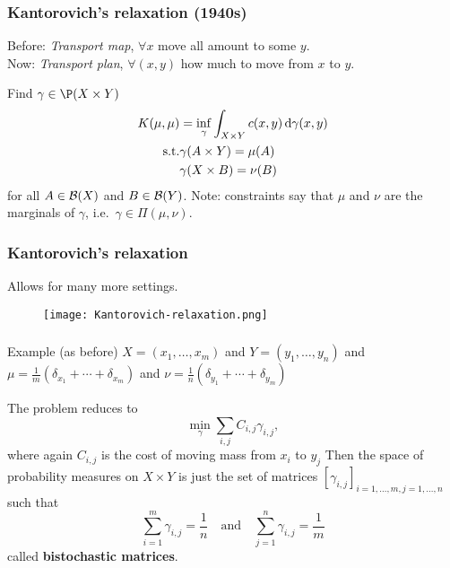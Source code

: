 \documentclass{beamer}
\begin{document}
\begin{frame}
  \frametitle{Kantorovich's relaxation (1940s)}
  Before: \emph{Transport map}, $\forall x$ move all amount to some $y$.\\
  Now: \emph{Transport plan}, $\forall (x,y)$ how much to move from $x$ to $y$.

  \begin{block}{}
    Find $\gamma \in \P(X \times Y)$
    \begin{equation}
      \begin{aligned}
        K(\mu, \mu) &= \inf_{\gamma} \int_{X \times Y} c(x,y) \mathop{}\!\mathrm{d} \gamma(x,y) \\
        \text{s.t.} & \gamma(A \times Y) = \mu(A) \\
                    & \gamma(X \times B) = \nu(B)
      \end{aligned}
    \end{equation}
    for all $A \in \mathcal{B}(X)$ and $B \in \mathcal{B}(Y)$.
    Note: constraints say that $\mu$ and $\nu$ are the marginals of $\gamma$, i.e.\ $\gamma \in \Pi(\mu, \nu)$.
  \end{block}

\end{frame}

\begin{frame}
  \frametitle{Kantorovich's relaxation}
  Allows for many more settings.
  \begin{figure}[ht]
    \centering
    \texttt{[image: Kantorovich-relaxation.png]}
    \caption{\label{fig:label} }
  \end{figure}
\end{frame}

\begin{frame}
  \frametitle{}
  \begin{block}{Example (as before)}
    $X=(x_1, \dots, x_m)$ and $Y=(y_1, \dots, y_n)$ and
    $\mu= \frac{1}{m}(\delta_{x_1}+ \cdots + \delta_{x_m})$ and $\nu= \frac{1}{n}(\delta_{y_1}+ \cdots + \delta_{y_m})$
  \end{block}
  The problem reduces to
  \begin{equation}
    \min_{\gamma} \sum_{i,j} C_{i,j} \gamma_{i,j},
  \end{equation}
  where again $C_{i,j}$ is the cost of moving mass from $x_i$ to $y_j$
  Then the space of probability measures on $X\times Y$ is just the set of matrices ${[\gamma_{i,j}]}_{i=1,\dots,m, j=1,\dots,n}$
  such that
  \begin{equation}
    \sum_{i=1}^{m} \gamma_{i,j} = \frac{1}{n} \quad \text{and} \quad \sum_{j=1}^{n} \gamma_{i,j} = \frac{1}{m}
  \end{equation}
  called \textbf{bistochastic matrices}.
\end{frame}
\end{document}
